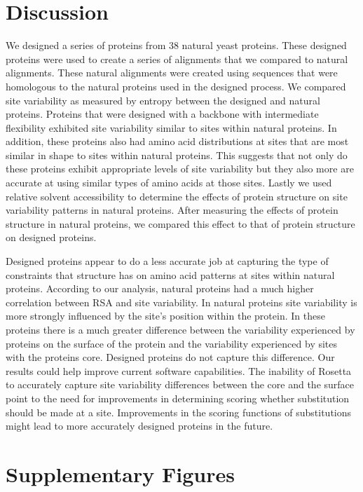 \documentclass[12pt]{article}
\begin{document}
\section{Discussion}
We designed a series of proteins from 38 natural yeast proteins. These designed proteins were used to create a series of alignments that we compared to natural alignments. These natural alignments were created using sequences that were homologous to the natural proteins used in the designed process.  We compared site variability as measured by entropy between the designed and natural proteins. Proteins that were designed with a backbone with intermediate flexibility exhibited site variability similar to sites within natural proteins. In addition, these proteins also had amino acid distributions at sites that are most similar in shape to sites within natural proteins. This suggests that not only do these proteins exhibit appropriate levels of site variability but they also more are accurate at using similar types of amino acids at those sites.  Lastly we used relative solvent accessibility to determine the effects of protein structure on site variability patterns in natural proteins. After measuring the effects of protein structure in natural proteins, we compared this effect to that of protein structure on designed proteins. 
\par Designed proteins appear to do a less accurate job at capturing the type of constraints that structure has on amino acid patterns at sites within natural proteins. According to our analysis, natural proteins had a much higher correlation between RSA and site variability. In natural proteins site variability is more strongly influenced by the site's position within the protein. In these proteins there is a much greater difference between the variability experienced by proteins on the surface of the protein and the variability experienced by sites with the proteins core. Designed proteins do not capture this difference.  Our results could help improve current software capabilities. The inability of Rosetta to accurately capture site variability differences between the core and the surface point to the need for improvements in determining scoring whether substitution should be made at a site. Improvements in the scoring functions of substitutions might lead to more accurately designed proteins in the future.

\section{Supplementary Figures}
\label{SupFigs}
\end{document}
